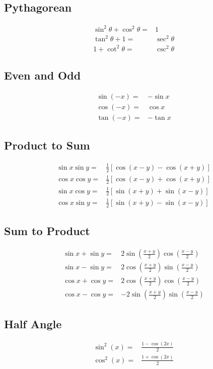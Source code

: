 \documentclass[10pt]{article}
\begin{document}
\begin{multicols}{2}
  \subsection*{Pythagorean}
  \begin{align*}
     & \sin^{2}\theta + \cos^{2}\theta = & 1              \\
     & \tan^{2}\theta + 1 =              & \sec^{2}\theta \\
     & 1 + \cot^{2}\theta =              & \csc^{2}\theta
  \end{align*}
  \subsection*{Even and Odd}
  \begin{align*}
     & \sin(-x) = & -\sin x \\
     & \cos(-x) = & \cos x  \\
     & \tan(-x) = & -\tan x
  \end{align*}
  \subsection*{Product to Sum}
  \begin{align*}
     & \sin x \sin y = & \frac{1}{2}[\cos(x-y) - \cos(x+y)] \\
     & \cos x \cos y = & \frac{1}{2}[\cos(x-y) + \cos(x+y)] \\
     & \sin x \cos y = & \frac{1}{2}[\sin(x+y) + \sin(x-y)] \\
     & \cos x \sin y = & \frac{1}{2}[\sin(x+y) - \sin(x-y)]
  \end{align*}
  \subsection*{Sum to Product}
  \begin{align*}
     & \sin x + \sin y = & 2\sin\left(\frac{x+y}{2}\right)\cos\left(\frac{x-y}{2}\right)  \\
     & \sin x - \sin y = & 2\cos\left(\frac{x+y}{2}\right)\sin\left(\frac{x-y}{2}\right)  \\
     & \cos x + \cos y = & 2\cos\left(\frac{x+y}{2}\right)\cos\left(\frac{x-y}{2}\right)  \\
     & \cos x - \cos y = & -2\sin\left(\frac{x+y}{2}\right)\sin\left(\frac{x-y}{2}\right)
  \end{align*}
  \subsection*{Half Angle}
  \begin{align*}
     & \sin^{2}(x) = & \frac{1 - \cos(2x)}{2} \\
     & \cos^{2}(x) = & \frac{1 + \cos(2x)}{2} 
  \end{align*}

\end{multicols}
\end{document}
